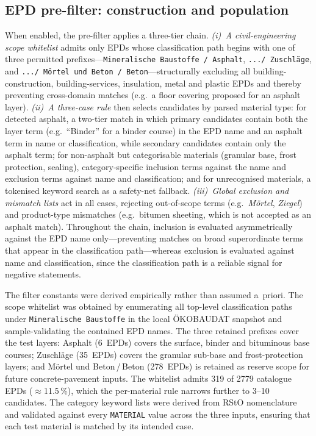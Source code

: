 \documentclass[10pt, a4paper, twocolumn]{article}
\begin{document}
\subsection{EPD pre-filter: construction and population}
\label{sec:filter}

When enabled, the pre-filter applies a three-tier chain. \emph{(i)~A civil-engineering
scope whitelist} admits only EPDs whose classification path begins with one of three
permitted prefixes---\texttt{Mineralische Baustoffe / Asphalt},
\texttt{.../ Zuschl\"age}, and \texttt{.../ M\"ortel und Beton / Beton}---structurally
excluding all building-construction, building-services, insulation, metal and plastic
EPDs and thereby preventing cross-domain matches (e.g.\ a floor covering proposed for
an asphalt layer). \emph{(ii)~A three-case rule} then selects candidates by parsed
material type: for detected asphalt, a two-tier match in which primary candidates
contain both the layer term (e.g.\ ``Binder'' for a binder course) in the EPD name
and an asphalt term in name or classification, while secondary candidates contain only
the asphalt term; for non-asphalt but categorisable materials (granular base, frost
protection, sealing), category-specific inclusion terms against the name and exclusion
terms against name and classification; and for unrecognised materials, a tokenised
keyword search as a safety-net fallback. \emph{(iii)~Global exclusion and mismatch
lists} act in all cases, rejecting out-of-scope terms (e.g.\ \emph{M\"ortel},
\emph{Ziegel}) and product-type mismatches (e.g.\ bitumen sheeting, which is not
accepted as an asphalt match). Throughout the chain, inclusion is evaluated
asymmetrically against the EPD name only---preventing matches on broad superordinate
terms that appear in the classification path---whereas exclusion is evaluated against
name and classification, since the classification path is a reliable signal for
negative statements.

The filter constants were derived empirically rather than assumed a~priori. The scope
whitelist was obtained by enumerating all top-level classification paths under
\texttt{Mineralische Baustoffe} in the local \"OKOBAUDAT snapshot and sample-validating
the contained EPD names. The three retained prefixes cover the test layers: Asphalt
(6~EPDs) covers the surface, binder and bituminous base courses; Zuschl\"age
(35~EPDs) covers the granular sub-base and frost-protection layers; and
M\"ortel und Beton\,/\,Beton (278~EPDs) is retained as reserve scope for future
concrete-pavement inputs. The whitelist admits 319 of 2779 catalogue EPDs
($\approx$11.5\,\%), which the per-material rule narrows further to 3--10 candidates.
The category keyword lists were derived from RStO nomenclature and validated against
every \texttt{MATERIAL} value across the three inputs, ensuring that each test material
is matched by its intended case.
\end{document}
